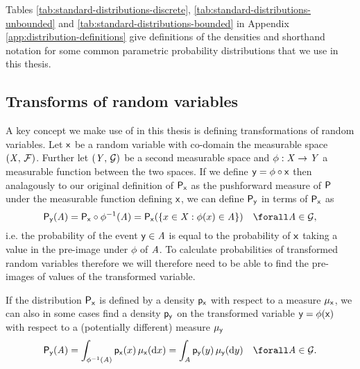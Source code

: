 Tables \ref{tab:standard-distributions-discrete}, \ref{tab:standard-distributions-unbounded} and \ref{tab:standard-distributions-bounded} in Appendix \ref{app:distribution-definitions} give definitions of the densities and shorthand notation for some common parametric probability distributions that we use in this thesis.

\subsection{Transforms of random variables}\label{subsec:change-of-variables}

A key concept we make use of in this thesis is defining transformations of random variables. Let $\mathsf{x}$ be a random variable with co-domain the measurable space $(\mathit{X},\,\mathcal{F})$. Further let $(\mathit{Y},\,\mathcal{G})$ be a second measurable space and $\phi : \mathit{X} \to \mathit{Y}$ a measurable function between the two spaces. If we define $\mathsf{y} = \phi \circ \mathsf{x}$ then analagously to our original definition of $\mathsf{P}_{\mathsf{x}}$ as the pushforward measure of $\mathsf{P}$ under the measurable function defining $\mathsf{x}$, we can define $\mathsf{P}_{\mathsf{y}}$ in terms of $\mathsf{P}_{\mathsf{x}}$ as
\begin{equation}\label{eq:change-of-variables-probability}
  \prob{\rvar{y}}(\set{A}) = 
  \prob{\rvar{x}} \circ \phi^{-1}(\set{A}) =
  \prob{\rvar{x}}\lpa \lbrace x \in \set{X} : \phi(x) \in \set{A} \rbrace \rpa
  \quad \forall \set{A} \in \sset{G},
\end{equation}
i.e. the probability of the event $\mathsf{y} \in \mathit{A}$ is equal to the probability of $\mathsf{x}$ taking a value in the pre-image under $\phi$ of $\mathit{A}$. To calculate probabilities of transformed random variables therefore we will therefore need to be able to find the pre-images of values of the transformed variable.

If the distribution $\mathsf{P}_{\mathsf{x}}$ is defined by a density $\mathsf{p}_{\mathsf{x}}$ with respect to a measure $\mu_{\mathsf{x}}$, we can also in some cases find a density $\mathsf{p}_{\mathsf{y}}$ on the transformed variable $\mathsf{y} = \phi(\mathsf{x})$ with respect to a (potentially different) measure $\mu_{\mathsf{y}}$
\begin{equation}\label{eq:change-of-variables-general}
  \prob{\rvar{y}}(\set{A}) =
  \int_{\phi^{-1}(\set{A})} \pden{\rvar{x}}(x) \,\mu_{\rvar{x}}(\dr x) = 
  \int_{\set{A}} \pden{\rvar{y}}(y) \,\mu_{\rvar{y}}(\dr y)
  \quad \forall \set{A} \in \sset{G}.
\end{equation}

